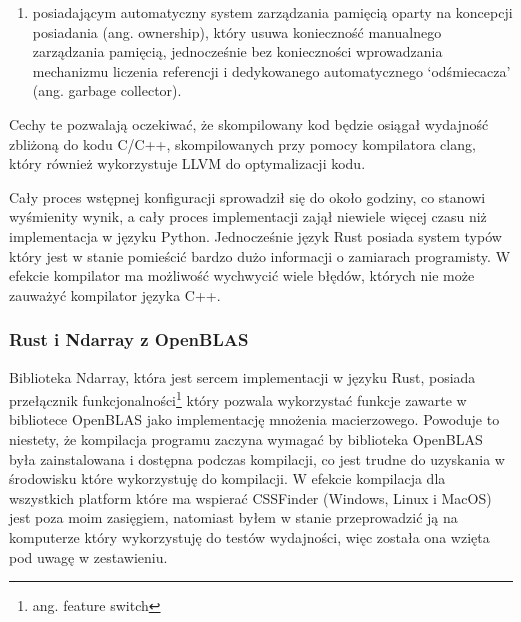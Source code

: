 \documentclass[11pt, a4paper]{article}
\begin{document}
\begin{sloppypar}
\begin{enumerate}
      \item posiadającym automatyczny system zarządzania pamięcią oparty na koncepcji posiadania
        (ang. ownership), który usuwa konieczność manualnego zarządzania pamięcią,
        jednocześnie bez konieczności wprowadzania mechanizmu liczenia referencji i
        dedykowanego automatycznego `odśmiecacza' (ang. garbage collector).
    \end{enumerate}

    Cechy te pozwalają oczekiwać, że skompilowany kod będzie osiągał wydajność zbliżoną do
    kodu C/C++, skompilowanych przy pomocy kompilatora clang, który również wykorzystuje
    LLVM do optymalizacji kodu.

    Cały proces wstępnej konfiguracji sprowadził się do około godziny, co stanowi
    wyśmienity wynik, a cały proces implementacji zajął niewiele więcej czasu niż implementacja
    w języku Python. Jednocześnie język Rust posiada system typów który jest w stanie
    pomieścić bardzo dużo informacji o zamiarach programisty. W efekcie kompilator ma możliwość
    wychwycić wiele błędów, których nie może zauważyć kompilator języka C++.

    \subsubsection{Rust i Ndarray z OpenBLAS}
    Biblioteka Ndarray, która jest sercem implementacji w języku Rust, posiada
    przełącznik funkcjonalności\footnote{ang. feature switch} który pozwala wykorzystać funkcje
    zawarte w bibliotece OpenBLAS jako implementację mnożenia macierzowego. Powoduje to
    niestety, że kompilacja programu zaczyna wymagać by biblioteka OpenBLAS była zainstalowana
    i dostępna podczas kompilacji, co jest trudne do uzyskania w środowisku które
    wykorzystuję do kompilacji. W efekcie kompilacja dla wszystkich platform które ma wspierać
    CSSFinder (Windows, Linux i MacOS) jest poza moim zasięgiem, natomiast byłem w stanie
    przeprowadzić ją na komputerze który wykorzystuję do testów wydajności, więc została
    ona wzięta pod uwagę w zestawieniu.


\end{sloppypar}
\end{document}
